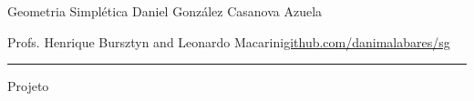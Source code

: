
\usepackage[style=authortitle-terse,backend=bibtex]{biblatex}




\begin{minipage}{\textwidth}
	\begin{minipage}{1\textwidth}
		Geometria Simpl\'etica \hfill Daniel González Casanova Azuela
		
		{\small Profs. Henrique Bursztyn and Leonardo Macarini\hfill\href{https://github.com/danimalabares/sg}{github.com/danimalabares/sg}}
	\end{minipage}
\end{minipage}\vspace{.2cm}\hrule

\vspace{10pt}
{\huge Projeto}

